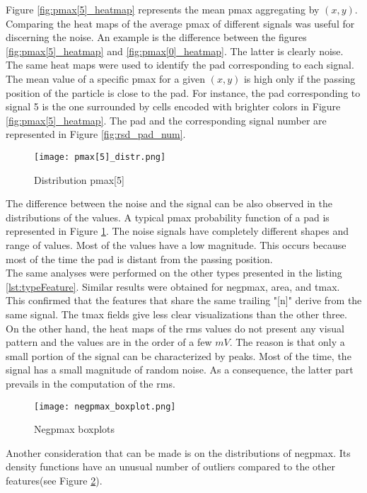 \documentclass[conference]{IEEEtran}
\begin{document}
Figure \ref{fig:pmax[5]_heatmap} represents the mean pmax aggregating by $(x, y)$. Comparing the heat maps of the average pmax of different signals was useful for discerning the noise. An example is the difference between the figures \ref{fig:pmax[5]_heatmap} and \ref{fig:pmax[0]_heatmap}. The latter is clearly noise. \\
The same heat maps were used to identify the pad corresponding to each signal. The mean value of a specific pmax for a given $(x, y)$ is high only if the passing position of the particle is close to the pad. For instance, the pad corresponding to signal 5 is the one surrounded by cells encoded with brighter colors in Figure \ref{fig:pmax[5]_heatmap}.
The pad and the corresponding signal number are represented in Figure \ref{fig:rsd_pad_num}.\\

\begin{figure}[htbp]
\centerline{\texttt{[image: pmax[5]\_distr.png]}}
\caption{Distribution pmax[5]}
\label{fig:pmax[5]_distr}
\end{figure}
The difference between the noise and the signal can be also observed in the distributions of the values. A typical pmax probability function of a pad is represented in Figure \ref{fig:pmax[5]_distr}. The noise signals have completely different shapes and range of values. Most of the values have a low magnitude. This occurs because most of the time the pad is distant from the passing position.\\

The same analyses were performed on the other types presented in the listing \ref{lst:typeFeature}. Similar results were obtained for negpmax, area, and tmax. This confirmed that the features that share the same trailing "[n]" derive from the same signal. The tmax fields give less clear visualizations than the other three. On the other hand, the heat maps of the rms values do not present any visual pattern and the values are in the order of a few $mV$. The reason is that only a small portion of the signal can be characterized by peaks. Most of the time, the signal has a small magnitude of random noise. As a consequence, the latter part prevails in the computation of the rms.\\

\begin{figure}[htbp]
\centerline{\texttt{[image: negpmax\_boxplot.png]}}
\caption{Negpmax boxplots}
\label{fig:negpmax_boxplots}
\end{figure}
Another consideration that can be made is on the distributions of negpmax. Its density functions have an unusual number of outliers compared to the other features(see Figure \ref{fig:negpmax_boxplots}). 
\end{document}
